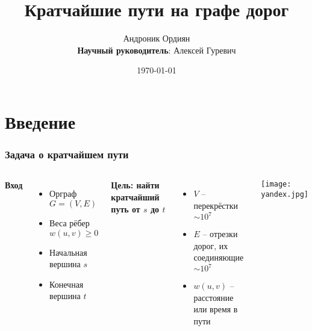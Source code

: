 \documentclass{beamer}
\title[Граф дорог]{Кратчайшие пути на графе дорог} %
\author{Андроник Ордиян\\ \textbf{Научный руководитель}: Алексей Гуревич} %
\institute[SPbAU] %
{

Академический университет  \\%

}
\date{\today} %
\begin{document}
\begin{frame}
\titlepage %
\end{frame}



\section{Введение} %

\begin{frame}
\frametitle{Задача о кратчайшем пути}
\begin{columns}[c] %

\textbf{Вход}
\begin{itemize}
\item Орграф $G = (V, E)$
\item Веса рёбер $w(u, v) \geq 0$
\item Начальная вершина $s$
\item Конечная вершина $t$
\end{itemize}

\textbf{Цель: найти кратчайший путь от $s$ до $t$}
\begin{itemize}
\item $V$ -- перекрёстки $\sim 10^7$
\item $E$ -- отрезки дорог, их соединяющие $\sim 10^7$
\item $w(u,v)$ -- расстояние или время в пути
\end{itemize}

\texttt{[image: yandex.jpg]}

\end{columns}
\end{frame}
\end{document}
